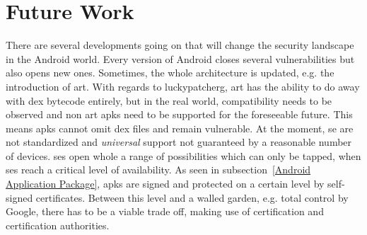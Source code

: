 \section{Future Work}\label{section:conclusion-future}
There are several developments going on that will change the security landscape in the Android world.
\newline
\newline
Every version of Android closes several vulnerabilities but also opens new ones.
Sometimes, the whole architecture is updated, e.g. the introduction of \gls{art}.
With regards to \gls{luckypatcherg}, \gls{art} has the ability to do away with dex bytecode entirely, but in the real world, compatibility needs to be observed and non \gls{art} \gls{apk}s need to be supported for the foreseeable future.
This means \gls{apk}s cannot omit \gls{dex} files and remain vulnerable.
\newline
\newline
At the moment, \gls{se} are not standardized and \textit{universal} support not guaranteed by a reasonable number of devices.
\gls{se}s open whole a range of possibilities which can only be tapped, when \gls{se}s reach a critical level of availability.
\newline
\newline
As seen in subsection~\ref{Android Application Package}, \gls{apk}s are signed and protected on a certain level by self-signed certificates.
Between this level and a walled garden, e.g. total control by Google, there has to be a viable trade off, making use of certification and certification authorities.
